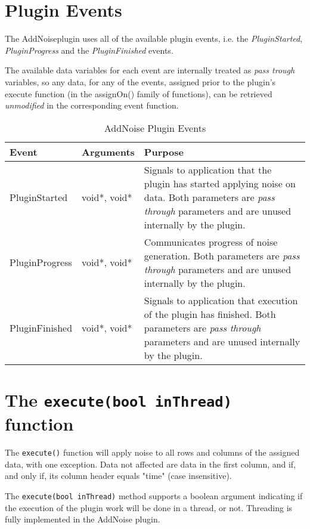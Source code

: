 \section{Plugin Events}
The AddNoiseplugin uses all of the available plugin events, i.e. the \emph{PluginStarted}, \emph{PluginProgress} and the \emph{PluginFinished} events.

The available data variables for each event are internally treated as \emph{pass trough} variables, so any data, for any of the events, assigned prior to
the plugin's execute function (in the assignOn() family of functions), can be retrieved \emph{unmodified} in the corresponding event function.
\begin{table}[ht]
\centering %
\begin{tabular}{l l p{7.5cm}} %

Event & Arguments & Purpose \\ [0.5ex] %
\hline %
\hline %
PluginStarted  	& 	void*, void*  & Signals to application that the plugin has started applying noise on data. Both parameters are \emph{pass through} parameters and are unused internally by the plugin.\\[0.5ex]
PluginProgress	& 	void*, void*  & Communicates progress of noise generation. Both parameters are \emph{pass through} parameters and are unused internally by the plugin. \\[0.5ex]
PluginFinished	& 	void*, void*  & Signals to application that execution of the plugin has finished. Both parameters are \emph{pass through} parameters and are unused internally by the plugin.\\

\hline %
\end{tabular}
\caption{AddNoise Plugin Events}
\label{table:AddNoisePluginEvents}
\end{table}

\section{The \texttt{execute(bool inThread)} function}
The \verb|execute()| function will apply noise to all rows and columns of the assigned data, with one exception. Data not affected are data in the first column, and if, and only if, its column header equals "time" (case insensitive).

The \verb|execute(bool inThread)| method supports a boolean argument indicating if the execution of the plugin work will be done in a thread, or not. Threading is fully implemented in the AddNoise plugin.

